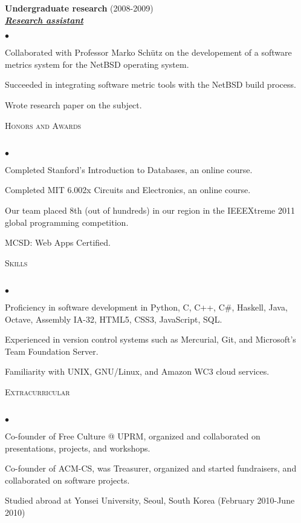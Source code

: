 \documentclass{article}
\newcommand{\lineunder}{\vspace*{-8pt} \\ \hspace*{-18pt} \hrulefill \\}
\newcommand{\header}[1]{{\hspace*{-15pt}\vspace*{6pt} \textsc{#1}} \vspace*{-6pt} \lineunder}
\newcommand{\employer}[3]{{ \textbf{#1} (#2)\\ \underline{\textbf{\emph{#3}}}\\  }}
\newenvironment{achievements}{\begin{list}{$\bullet$}{\topsep 0pt \itemsep -2pt}}{\vspace*{4pt}\end{list}}
\begin{document}
\employer{Undergraduate research}{2008-2009}{Research assistant}
	\begin{achievements}
	\item Collaborated with Professor Marko Sch\"{u}tz on the developement of a software metrics system for the NetBSD operating system.
	\item Succeeded in integrating software metric tools with the NetBSD build process.
	\item Wrote research paper on the subject.
	\end{achievements}

\newpage

\header{Honors and Awards}
\begin{achievements}
\item Completed Stanford's Introduction to Databases, an online course.
\item Completed MIT 6.002x Circuits and Electronics, an online course.
\item Our team placed 8th (out of hundreds) in our region in the IEEEXtreme 2011 global programming competition.
\item MCSD: Web Apps Certified.
\end{achievements}

\header{Skills}
\begin{achievements}
\item Proficiency in software development in Python, C, C++, C\string#, Haskell, Java, Octave, Assembly IA-32, HTML5, CSS3, JavaScript, SQL.
\item Experienced in version control systems such as Mercurial, Git, and Microsoft's Team Foundation Server.
\item Familiarity with UNIX, GNU/Linux, and Amazon WC3 cloud services.
\end{achievements}

\header{Extracurricular}
\begin{achievements}
\item Co-founder of Free Culture @ UPRM, organized and collaborated on presentations, projects, and workshops.
\item Co-founder of ACM-CS, was Treasurer, organized and started fundraisers, and collaborated on software projects.
\item Studied abroad at Yonsei University, Seoul, South Korea (February 2010-June 2010)
\end{achievements}
\end{document}

